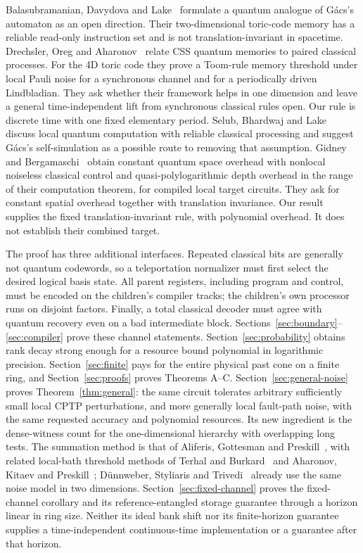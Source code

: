 Balasubramanian, Davydova and Lake~\cite[Section~1.3(3)]{BDL2026} formulate a quantum analogue of G\'acs's automaton as an open direction. Their two-dimensional toric-code memory has a reliable read-only instruction set and is not translation-invariant in spacetime. Drechsler, Oreg and Aharonov~\cite{DOA2026} relate CSS quantum memories to paired classical processes. For the 4D toric code they prove a Toom-rule memory threshold under local Pauli noise for a synchronous channel and for a periodically driven Lindbladian. They ask whether their framework helps in one dimension and leave a general time-independent lift from synchronous classical rules open. Our rule is discrete time with one fixed elementary period. Selub, Bhardwaj and Lake~\cite[Sections~1.2--1.3]{SBL2026} discuss local quantum computation with reliable classical processing and suggest G\'acs's self-simulation as a possible route to removing that assumption. Gidney and Bergamaschi~\cite[Theorem~1.2 and Section~11]{GB2025} obtain constant quantum space overhead with nonlocal noiseless classical control and quasi-polylogarithmic depth overhead in the range of their computation theorem, for compiled local target circuits. They ask for constant spatial overhead together with translation invariance. Our result supplies the fixed translation-invariant rule, with polynomial overhead. It does not establish their combined target.

The proof has three additional interfaces. Repeated classical bits are generally not quantum codewords, so a teleportation normalizer must first select the desired logical basis state. All parent registers, including program and control, must be encoded on the children's compiler tracks; the children's own processor runs on disjoint factors. Finally, a total classical decoder must agree with quantum recovery even on a bad intermediate block. Sections~\ref{sec:boundary}--\ref{sec:compiler} prove these channel statements. Section~\ref{sec:probability} obtains rank decay strong enough for a resource bound polynomial in logarithmic precision. Section~\ref{sec:finite} pays for the entire physical past cone on a finite ring, and Section~\ref{sec:proofs} proves Theorems A--C. Section~\ref{sec:general-noise} proves Theorem~\ref{thm:general}: the same circuit tolerates arbitrary sufficiently small local CPTP perturbations, and more generally local fault-path noise, with the same requested accuracy and polynomial resources. Its new ingredient is the dense-witness count for the one-dimensional hierarchy with overlapping long tests. The summation method is that of Aliferis, Gottesman and Preskill~\cite{AGP2006}, with related local-bath threshold methods of Terhal and Burkard~\cite{TB2005} and Aharonov, Kitaev and Preskill~\cite{AKP2006}; D\"unnweber, Styliaris and Trivedi~\cite[Definition~3]{DST2026} already use the same noise model in two dimensions. Section~\ref{sec:fixed-channel} proves the fixed-channel corollary and its reference-entangled storage guarantee through a horizon linear in ring size. Neither its ideal bank shift nor its finite-horizon guarantee supplies a time-independent continuous-time implementation or a guarantee after that horizon.
